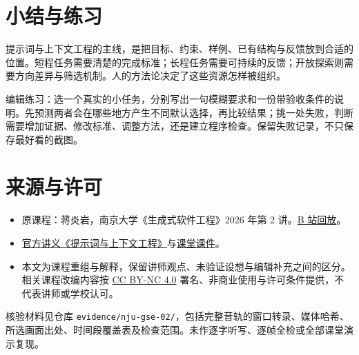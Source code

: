 \documentclass[
  11pt,
  fontset=fandol]{ctexart}
\providecommand{\tightlist}{%
  \setlength{\itemsep}{0pt}\setlength{\parskip}{0pt}}
\begin{document}
\section{小结与练习}\label{ux5c0fux7ed3ux4e0eux7ec3ux4e60}

提示词与上下文工程的主线，是把目标、约束、样例、已有结构与反馈放到合适的位置。短程任务需要清楚的完成标准；长程任务需要可持续的反馈；开放探索则需要方向差异与筛选机制。人的方法论决定了这些资源怎样被组织。

编辑练习：选一个真实的小任务，分别写出一句模糊要求和一份带验收条件的说明。先预测两者会在哪些地方产生不同默认选择，再比较结果；挑一处失败，判断需要增加证据、修改标准、调整方法，还是建立程序检查。保留失败记录，不只保存最好看的截图。


\section{来源与许可}\label{ux6765ux6e90ux4e0eux8bb8ux53ef}

\begin{itemize}
\tightlist
\item
  原课程：蒋炎岩，南京大学《生成式软件工程》2026 年第 2
  讲。\href{https://www.bilibili.com/video/BV1CQt365EzW/}{B 站回放}。
\item
  \href{https://jyywiki.cn/GSE/2026/lect2.md}{官方讲义《提示词与上下文工程》}与\href{https://jyywiki.cn/GSE/2026/slides2.html}{课堂课件}。
\item
  本文为课程重组与解释，保留讲师观点、未验证设想与编辑补充之间的区分。相关课程改编内容按
  \href{https://creativecommons.org/licenses/by-nc/4.0/}{CC BY-NC 4.0}
  署名、非商业使用与许可条件提供，不代表讲师或学校认可。
\end{itemize}

核验材料见仓库
\texttt{evidence/nju-gse-02/}，包括完整音轨的窗口转录、媒体哈希、所选画面出处、时间段覆盖表及检查范围。未作逐字听写、逐帧全检或全部课堂演示复现。
\end{document}
